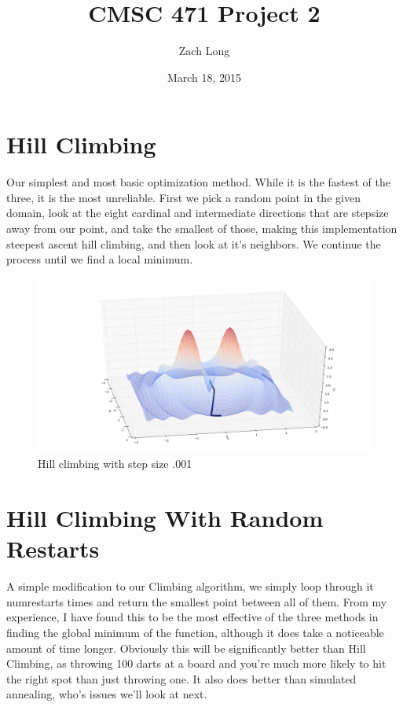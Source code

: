 \documentclass{article}
\title{CMSC 471 Project 2}
\author{Zach Long}
\date{March 18, 2015}
\begin{document}
   \maketitle
   \section{Hill Climbing}
   Our simplest and most basic optimization method. While it is the fastest of the three, it is the most unreliable. First we pick a random point in the given domain, look at the eight cardinal and intermediate directions that are stepsize away from our point, and take the smallest of those, making this implementation steepest ascent hill climbing, and then look at it's neighbors. We continue the process until we find a local minimum.

   \begin{figure}[h!]
      \includegraphics[width=\linewidth]{hill_climb.png}
      \caption{Hill climbing with step size .001}
      \label{fig:graph1}
   \end{figure}

   \section{Hill Climbing With Random Restarts}
   A simple modification to our Climbing algorithm, we simply loop through it numrestarts times and return the smallest point between all of them. From my experience, I have found this to be the most effective of the three methods in finding the global minimum of the function, although it does take a noticeable amount of time longer. Obviously this will be significantly better than Hill Climbing, as throwing 100 darts at a board and you're much more likely to hit the right spot than just throwing one. It also does better than simulated annealing, who's issues we'll look at next.
\end{document}
